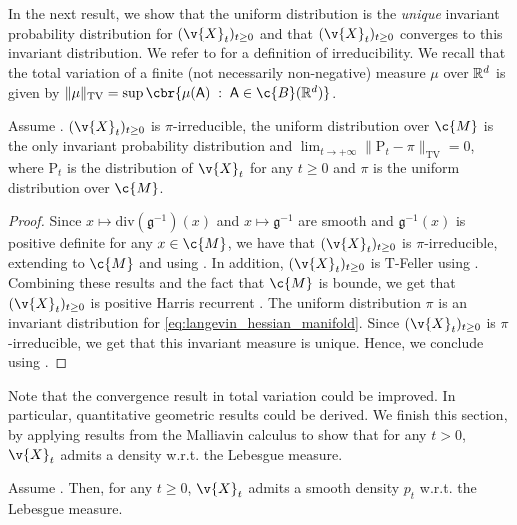In the next result, we show that the uniform distribution is the \emph{unique} invariant probability distribution for $(\v{X}_t)_{t \geq 0}$ and that $(\v{X}_t)_{t \geq 0}$ converges to this invariant distribution.
We refer to \cite[Section 2, p.490]{meyn1993stability} for a definition of irreducibility.
We recall that the total variation of a finite (not necessarily non-negative) measure $\mu$ over $\mathbb{R}^d$ is given by $\| \mu \|_{\mathrm{TV}} = \sup \cbr{\mu(\mathsf{A}) \; : \; \mathsf{A} \in \c{B}(\R^d)}$.

\begin{proposition}
	Assume \textup{}.
	$(\v{X}_t)_{t \geq 0}$ is
	$\pi$-irreducible, the uniform distribution over $\c{M}$ is the only invariant
	probability distribution and
	$\lim_{t \to +\infty} \|\mathrm{P}_t - \pi\|_{\mathrm{TV}} = 0$, where $\mathrm{P}_t$ is
	the distribution of $\v{X}_t$ for any $t \geq 0$ and $\pi$ is the uniform
	distribution over $\c{M}$.
\end{proposition}

\begin{proof}
	Since $x \mapsto \mathrm{div}(\mathfrak{g}^{-1})(x)$ and $x \mapsto \mathfrak{g}^{-1}$ are smooth and $\mathfrak{g}^{-1}(x)$ is positive definite for any $x \in \c{M}$, we have that $(\v{X}_t)_{t \geq 0}$ is $\pi$-irreducible, extending \cite[Lemma 1.4]{bhattacharya1978criteria} to $\c{M}$ and using \cite[Proposition 2.1]{meyn1993stability}.
	In addition, $(\v{X}_t)_{t \geq 0}$ is $\mathrm{T}$-Feller using \cite[Proposition 3.3]{meyn1993stability}.
	Combining these results and the fact that $\c{M}$ is bounde, we get that $(\v{X}_t)_{t \geq 0}$ is positive Harris recurrent \cite[Theorem 3.2]{meyn1993stability}.
	The uniform distribution $\pi$ is an invariant distribution for \eqref{eq:langevin_hessian_manifold}.
	Since $(\v{X}_t)_{t \geq 0}$ is $\pi$-irreducible, we get that this invariant measure is unique.
	Hence, we conclude using \cite[Theorem 6.1]{meyn1993stability}.
\end{proof}

Note that the convergence result in total variation could be improved.
In particular, quantitative geometric results could be derived.
We finish this section, by applying results from the Malliavin calculus to show that for any $t > 0$, $\v{X}_t$ admits a density w.r.t.
the Lebesgue measure.

\begin{proposition}
	Assume \textup{}.
	Then, for any $t \geq 0$, $\v{X}_t$ admits a smooth density $p_t$ w.r.t.
	the Lebesgue measure.
\end{proposition}

